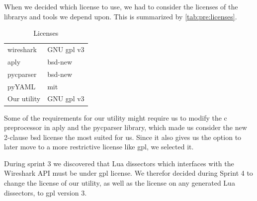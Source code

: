 When we decided which license to use, we had to consider the licenses of the \glspl{library} and tools we depend upon.
This is summarized by
\autoref{tab:pre:licenses}.
\begin{table}[!h] \footnotesize \center
\vspace{-10pt}
\caption{Licenses\label{tab:pre:licenses}}
\begin{tabular}{l l}
	\toprule
	\Gls{wireshark} & GNU \Gls{gpl} v3 \\
	\Gls{aply} & \Gls{bsd}-new \\
	\gls{pycparser} & \Gls{bsd}-new \\
	pyYAML & \Gls{mit} \\
	\midrule
	Our \gls{utility} & GNU \Gls{gpl} v3 \\
	\bottomrule
\end{tabular}
\vspace{-10pt}
\end{table}

\noindent Some of the requirements for our \gls{utility} might require us to modify
the \Gls{c} \gls{preprocessor} in \Gls{aply} and the \gls{pycparser} \gls{library},
which made us consider the new 2-clause \Gls{bsd} license the most suited for us.
Since it also gives us the option to later move to a more restrictive license like \Gls{gpl},
we selected it.

During sprint 3 we discovered that Lua dissectors which interfaces with the Wireshark API must
be under \Gls{gpl} license. We therefor decided during Sprint 4 to change the license of our
\gls{utility}, as well as the license on any generated Lua dissectors, to \Gls{gpl} version 3.

